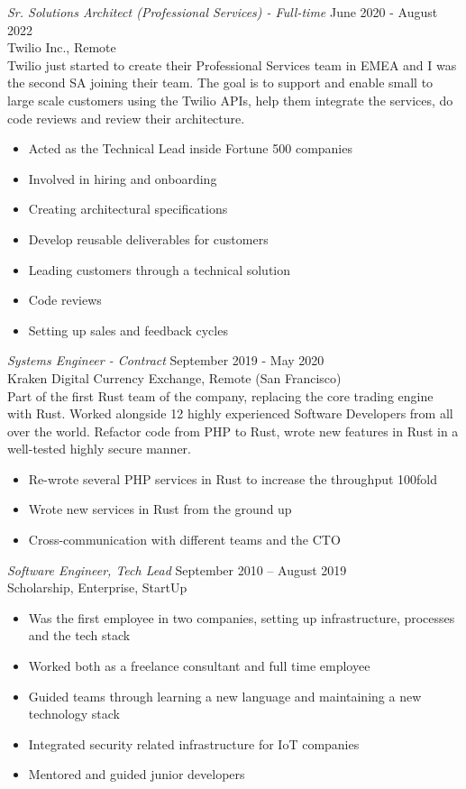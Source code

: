 \documentclass[10pt]{res} %
\begin{document}
\begin{resume}
{\sl Sr. Solutions Architect (Professional Services) - Full-time} \hfill June 2020 - August 2022 \\
Twilio Inc., Remote \\
Twilio just started to create their Professional Services team in EMEA and I was the second SA joining their team. The goal is to support and enable small to large scale customers using the Twilio APIs, help them integrate the services, do code reviews and review their architecture.
\begin{itemize} \itemsep -2pt %
\item Acted as the Technical Lead inside Fortune 500 companies
\item Involved in hiring and onboarding
\item Creating architectural specifications
\item Develop reusable deliverables for customers
\item Leading customers through a technical solution
\item Code reviews
\item Setting up sales and feedback cycles
\end{itemize}

{\sl Systems Engineer - Contract} \hfill September 2019 - May 2020 \\
Kraken Digital Currency Exchange, Remote (San Francisco)\\
Part of the first Rust team of the company, replacing the core trading engine with Rust. Worked alongside 12 highly experienced Software Developers from all over the world. Refactor code from PHP to Rust, wrote new features in Rust in a well-tested highly secure manner.
\begin{itemize}
	\item Re-wrote several PHP services in Rust to increase the throughput 100fold 
	\item Wrote new services in Rust from the ground up
	\item Cross-communication with different teams and the CTO
\end{itemize}

{\sl Software Engineer, Tech Lead} \hfill September 2010 -- August 2019 \\
Scholarship, Enterprise, StartUp\\

\begin{itemize}
	\item Was the first employee in two companies, setting up infrastructure, processes and the tech stack
	\item Worked both as a freelance consultant and full time employee
	\item Guided teams through learning a new language and maintaining a new technology stack
	\item Integrated security related infrastructure for IoT companies
	\item Mentored and guided junior developers
\end{itemize}


\end{resume}
\end{document}
